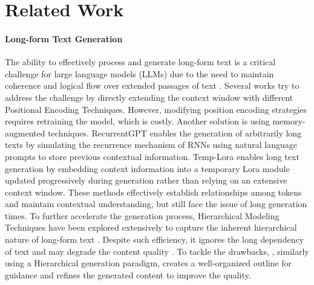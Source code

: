 \section{Related Work}
\paragraph{Long-form Text Generation}
The ability to effectively process and generate long-form text is a critical challenge for large language models (LLMs) due to the need to maintain coherence and logical flow over extended passages of text \citep{tan2021long-form,bai2023longbench,dong2023bamboo,li2023LooGLE}. Several works try to address the challenge by directly extending the context window with different Positional Encoding Techniques\citep{shaw2018rpe,wang2019spe}. However, modifying position encoding strategies requires retraining the model, which is costly. Another solution is using memory-augmented techniques. RecurrentGPT \citep{zhou2023recurrentgpt} enables the generation of arbitrarily long texts by simulating the recurrence mechanism of RNNs using natural language prompts to store previous contextual information. Temp-Lora \citep{wang2024templora} enables long text generation by embedding context information into a temporary Lora module updated progressively during generation rather than relying on an extensive context window. These methods effectively establish relationships among tokens and maintain contextual understanding, but still face the issue of long generation times. To further accelerate the generation process, Hierarchical Modeling Techniques have been explored extensively to capture the inherent hierarchical nature of long-form text \citep{fan2018hierarchicalstory,wu2021recursively}. Despite such efficiency, it ignores the long dependency of text and may degrade the content quality \citep{chang2023booookscore}. To tackle the drawbacks, \ourmethod, similarly using a Hierarchical generation paradigm, creates a well-organized outline for guidance and refines the generated content to improve the quality.
